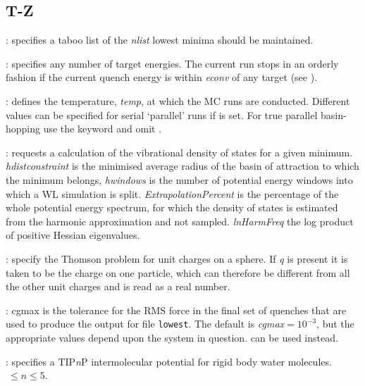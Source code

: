 {\subsection{T-Z}
: specifies a taboo list of the {\it nlist\/} lowest minima should be maintained.

: specifies any number of target energies. 
The current run stops in an orderly
fashion if the current quench energy is within {\it econv\/} of any target (see {\/}).

: defines the temperature, {\it temp\/}, at which the 
MC runs are conducted. Different values can be specified for serial `parallel' runs if
{} is set.
For true parallel basin-hopping use the {\/} keyword and omit {\/}.

: requests a calculation of the vibrational density of
states for a given minimum. {\it hdistconstraint} is the minimised average radius of the basin of attraction to which the minimum
belongs, {\it hwindows} is the number of potential energy windows into which a WL simulation is split. {\it 
ExtrapolationPercent} is the percentage of the whole potential energy spectrum, for which the density of states is estimated from
the harmonic approximation and not sampled. {\it lnHarmFreq} the log product of positive Hessian
eigenvalues.

: specify the Thomson problem for unit charges on a sphere.
If {\it q\/} is present it is taken to be the charge on one particle, which can
therefore be different from all the other unit charges and is read as a real number.


: cgmax is the tolerance for the
RMS force in the final set of quenches that are used to produce
the output for file {\tt lowest}. The default is
{\it cgmax\/}$=10^{-3}$, but the appropriate values depend upon the system in question.
 can be used instead.

: specifies a TIP{\it n\/}P intermolecular potential for rigid body water molecules.
$\ \le n \le 5$.

}
